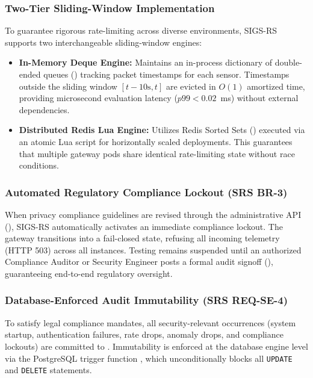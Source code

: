 \documentclass[a4paper]{article}
\begin{document}
\subsubsection{Two-Tier Sliding-Window Implementation}
To guarantee rigorous rate-limiting across diverse environments, SIGS-RS supports two interchangeable sliding-window engines:
\begin{itemize}
    \item \textbf{In-Memory Deque Engine:} Maintains an in-process dictionary of double-ended queues () tracking packet timestamps for each sensor. Timestamps outside the sliding window $[t - 10\text{s}, t]$ are evicted in $O(1)$ amortized time, providing microsecond evaluation latency ($p99 < 0.02$~ms) without external dependencies.
    \item \textbf{Distributed Redis Lua Engine:} Utilizes Redis Sorted Sets () executed via an atomic Lua script for horizontally scaled deployments. This guarantees that multiple gateway pods share identical rate-limiting state without race conditions.
\end{itemize}

\subsubsection{Automated Regulatory Compliance Lockout (SRS BR-3)}
When privacy compliance guidelines are revised through the administrative API (), SIGS-RS automatically activates an immediate compliance lockout. The gateway transitions into a fail-closed state, refusing all incoming telemetry (HTTP 503) across all instances. Testing remains suspended until an authorized Compliance Auditor or Security Engineer posts a formal audit signoff (), guaranteeing end-to-end regulatory oversight.

\subsubsection{Database-Enforced Audit Immutability (SRS REQ-SE-4)}
To satisfy legal compliance mandates, all security-relevant occurrences (system startup, authentication failures, rate drops, anomaly drops, and compliance lockouts) are committed to . Immutability is enforced at the database engine level via the PostgreSQL trigger function , which unconditionally blocks all \texttt{UPDATE} and \texttt{DELETE} statements.
\end{document}
